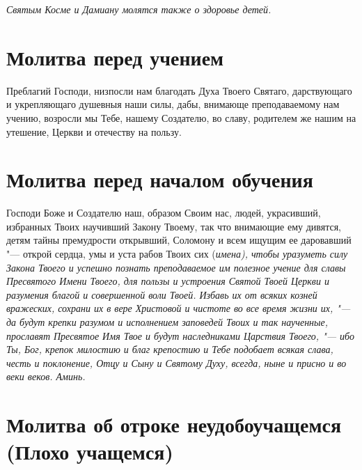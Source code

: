 \itshape Святым Косме и Дамиану молятся также о здоровье детей.\normalfont{} 

 



\bigskip\bigskip\mychapterending


  

\section{Молитва перед учением}
 


Преблагий Господи, низпосли нам благодать Духа Твоего Святаго, дарствующаго и укрепляющаго душевныя наши силы, дабы, внимающе преподаваемому нам учению, возросли мы Тебе, нашему Создателю, во славу, родителем же нашим на утешение, Церкви и отечеству на пользу.


\section{Молитва перед началом обучения}
 


Господи Боже и Создателю наш, образом Своим нас, людей, украсивший, избранных Твоих научивший Закону Твоему, так что внимающие ему дивятся, детям тайны премудрости открывший, Соломону и всем ищущим ее даровавший "--- открой сердца, умы и уста рабов Твоих сих (\itshape имена\normalfont{}), чтобы уразуметь силу Закона Твоего и успешно познать преподаваемое им полезное учение для славы Пресвятого Имени Твоего, для пользы и устроения Святой Твоей Церкви и разумения благой и совершенной воли Твоей. Избавь их от всяких козней вражеских, сохрани их в вере Христовой и чистоте во все время жизни их, "--- да будут крепки разумом и исполнением заповедей Твоих и так наученные, прославят Пресвятое Имя Твое и будут наследниками Царствия Твоего, "--- ибо Ты, Бог, крепок милостию и благ крепостию и Тебе подобает всякая слава, честь и поклонение, Отцу и Сыну и Святому Духу, всегда, ныне и присно и во веки веков. Аминь.


\section{Молитва об отроке неудобоучащемся (Плохо учащемся)}
 
